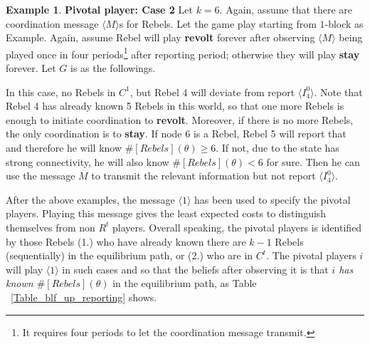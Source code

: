 \documentclass[12pt,letter]{article}
\theoremstyle{definition}
\newtheorem{example}{Example}[section]
\theoremstyle{remark}
\theoremstyle{claim}
\begin{document}
\begin{example} \label{ex_pivotal_2}\textbf{Pivotal player: Case 2}
Let $k=6$. Again, assume that there are coordination message $\langle M\rangle$s for Rebels. Let the game play starting from $1$-block as Example. Again, assume Rebel will play \textbf{revolt} forever after observing $\langle M \rangle$ being played once in four periods\footnote{It requires four periods to let the coordination message transmit.} after reporting period; otherwise they will play \textbf{stay} forever. Let $G$ is as the followings.

\begin{center}
\end{center}

In this case, no Rebels in $C^1$, but Rebel 4 will deviate from report $\langle I^0_4 \rangle$. Note that Rebel 4 has already known 5 Rebels in this world, so that one more Rebels is enough to initiate coordination to \textbf{revolt}. Moreover, if there is no more Rebels, the only coordination is to \textbf{stay}. If node 6 is a Rebel, Rebel 5 will report that and therefore he will know $\#[Rebels](\theta)\geq 6$. If not, due to the state has strong connectivity, he will also know $\#[Rebels](\theta)< 6$ for sure. Then he can use the message $M$ to transmit the relevant information but not report $\langle I^0_4 \rangle$.
\end{example}

After the above examples, the message $\langle 1 \rangle$ has been used to specify the pivotal players. Playing this message gives the least expected costs to distinguish themselves from non $R^t$ players. Overall speaking, the pivotal players is identified by those Rebels (1.) who have already known there are $k-1$ Rebels (sequentially) in the equilibrium path, or (2.) who are in $C^t$. The pivotal players $i$ will play $\langle 1 \rangle$ in such cases and so that the beliefs after observing it is that \textit{$i$ has known $\#[Rebels](\theta)$} in the equilibrium path, as Table ~\ref{Table_blf_up_reporting} shows.
\end{document}

